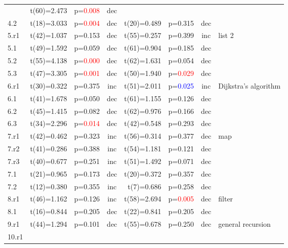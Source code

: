 \begin{table}
\begin{center}
\begin{tabular}{|l||c|c|c||c|c|c||l|}
    & t(60)=2.473 & p=\textcolor{red}{0.008} & dec
    & \\ \cline{1-7}
    4.2
    & t(18)=3.033 & p=\textcolor{red}{0.004} & dec
    & t(20)=0.489 & p=0.315 & dec
    & \\ \hline
    5.r1
    & t(42)=1.037 & p=0.153 & dec
    & t(55)=0.257 & p=0.399 & inc
    & list 2\\ \cline{1-7}
    5.1
    & t(49)=1.592 & p=0.059 & dec
    & t(61)=0.904 & p=0.185 & dec
    & \\ \cline{1-7}
    5.2
    & t(55)=4.138 & p=\textcolor{red}{0.000} & dec
    & t(62)=1.631 & p=0.054 & dec
    & \\ \cline{1-7}
    5.3
    & t(47)=3.305 & p=\textcolor{red}{0.001} & dec
    & t(50)=1.940 & p=\textcolor{red}{0.029} & dec
    & \\ \hline
    6.r1
    & t(30)=0.322 & p=0.375 & inc
    & t(51)=2.011 & p=\textcolor{blue}{0.025} & inc
    & Dijkstra's algorithm\\ \cline{1-7}
    6.1
    & t(41)=1.678 & p=0.050 & dec
    & t(61)=1.155 & p=0.126 & dec
    & \\ \cline{1-7}
    6.2
    & t(45)=1.415 & p=0.082 & dec
    & t(62)=0.976 & p=0.166 & dec
    & \\ \cline{1-7}
    6.3
    & t(34)=2.296 & p=\textcolor{red}{0.014} & dec
    & t(42)=0.548 & p=0.293 & dec
    & \\ \hline
    7.r1
    & t(42)=0.462 & p=0.323 & inc
    & t(56)=0.314 & p=0.377 & dec
    & map\\ \cline{1-7}
    7.r2
    & t(41)=0.286 & p=0.388 & inc
    & t(54)=1.181 & p=0.121 & dec
    & \\ \cline{1-7}
    7.r3
    & t(40)=0.677 & p=0.251 & inc
    & t(51)=1.492 & p=0.071 & dec
    & \\ \cline{1-7}
    7.1
    & t(21)=0.965 & p=0.173 & dec
    & t(20)=0.372 & p=0.357 & dec
    & \\ \cline{1-7}
    7.2
    & t(12)=0.380 & p=0.355 & inc
    & \, t(7)=0.686 & p=0.258 & dec
    & \\ \hline
    8.r1
    & t(46)=1.162 & p=0.126 & inc
    & t(58)=2.694 & p=\textcolor{red}{0.005} & dec
    & filter\\ \cline{1-7}
    8.1
    & t(16)=0.844 & p=0.205 & dec
    & t(22)=0.841 & p=0.205 & dec
    & \\ \hline
    9.r1
    & t(44)=1.294 & p=0.101 & dec
    & t(55)=0.678 & p=0.250 & dec
    & general recursion\\ \hline
    10.r1

\end{tabular}
\end{center}
\end{table}
